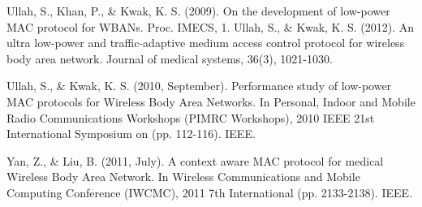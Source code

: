 \documentclass[11pt, conference, compsocconf, onecolumn]{IEEEtran}
\begin{document}
\begin{thebibliography}{0}
 Ullah, S., Khan, P., \& Kwak, K. S. (2009). On the development of low-power MAC protocol for WBANs. Proc. IMECS, 1.
Ullah, S., \& Kwak, K. S. (2012). An ultra low-power and traffic-adaptive medium access control protocol for wireless body area network. Journal of medical systems, 36(3), 1021-1030.

  Ullah, S., \& Kwak, K. S. (2010, September). Performance study of low-power MAC protocols for Wireless Body Area Networks. In Personal, Indoor and Mobile Radio Communications Workshops (PIMRC Workshops), 2010 IEEE 21st International Symposium on (pp. 112-116). IEEE.
     
 Yan, Z., \& Liu, B. (2011, July). A context aware MAC protocol for medical Wireless Body Area Network. In Wireless Communications and Mobile Computing Conference (IWCMC), 2011 7th International (pp. 2133-2138). IEEE.
\end{thebibliography}
\end{document}
